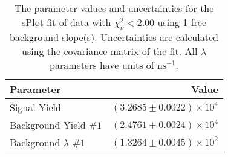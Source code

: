
\begin{table}
    \begin{center}
        \begin{tabular}{lr}\toprule
            Parameter & Value \\\midrule
            Signal Yield & $(3.2685 \pm 0.0022) \times 10^{4}$ \\
            Background Yield $\#1$ & $(2.4761 \pm 0.0024) \times 10^{4}$ \\
            Background $\lambda$ $\#1$ & $(1.3264 \pm 0.0045) \times 10^{2}$ \\\bottomrule
        \end{tabular}
        \caption{The parameter values and uncertainties for the sPlot fit of data with $\chi^2_\nu < 2.00$ using 1 free background slope(s). Uncertainties are calculated using the covariance matrix of the fit. All $\lambda$ parameters have units of $\si{\nano\second}^{-1}$.}
    \end{center}
\end{table}
